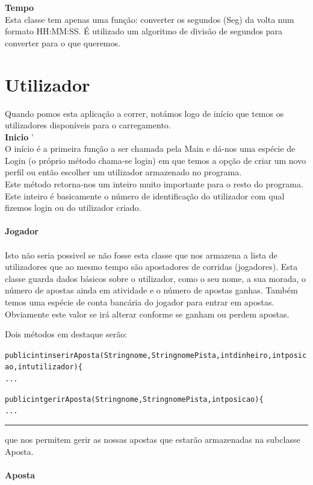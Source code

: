 \documentclass[10pt]{article}
\newenvironment{code}                    
{\textbf{
} \hspace{1cm} \hrulefill \\ 
\smallskip 
\begin{center}
\begin{minipage}{0.9\textwidth} 
\begin{alltt}\small}
{\end{alltt}
\end{minipage}
\end{center}
\hrule\smallskip
}
\begin{document}
\textbf{Tempo}
\\
Esta classe tem apenas uma função: converter os segundos (Seg) da volta num formato HH:MM:SS.
É utilizado um algoritmo de divisão de segundos para converter para o que queremos.

\pagebreak

\section{Utilizador}

Quando pomos esta aplicação a correr, notámos logo de início que temos os utilizadores disponíveis para o carregamento.
\\

\textbf{Inicio}
'
\\
O início é a primeira função a ser chamada pela Main e dá-nos uma espécie de Login (o próprio método chama-se login) em que temos a opção de criar um novo perfil ou então escolher um utilizador armazenado no programa.
\\
Este método retorna-nos um inteiro muito importante para o resto do programa. Este inteiro é basicamente o número de identificação do utilizador com qual fizemos login ou do utilizador criado.
\\ 
\\
\textbf{Jogador}
\\
\\
Isto não seria possivel se não fosse esta classe que nos armazena a lista de utilizadores que ao mesmo tempo são apostadores de corridas (jogadores).
Esta classe guarda dados básicos sobre o utilizador, como o seu nome, a sua morada, o número de apostas ainda em atividade e o número de apostas ganhas.
Também temos uma espécie de conta bancária do jogador para entrar em apostas. Obviamente este valor se irá alterar conforme se ganham ou perdem apostas.

Dois métodos em destaque serão:
\begin{code} 
public int inserirAposta (String nome, String nomePista, int dinheiro, int posicao, int utilizador)\{
...

public int gerirAposta (String nome, String nomePista, int posicao)\{
...


\end{code}
que nos permitem gerir as nossas apostas que estarão armazenadas na subclasse Aposta.
\\
\\

\textbf{Aposta}
\end{document}
